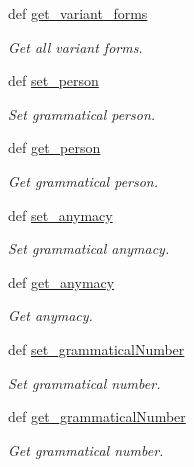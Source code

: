 \begin{DoxyCompactItemize}
def \hyperlink{classlmf_1_1src_1_1morphology_1_1word__form_1_1_word_form_a983151c5529388c7a3002b3239a98b98}{get\+\_\+variant\+\_\+forms}
\begin{DoxyCompactList}\small\item\em Get all variant forms. \end{DoxyCompactList}\item 
def \hyperlink{classlmf_1_1src_1_1morphology_1_1word__form_1_1_word_form_aae046a3403c0fe9ae8f35289878cba67}{set\+\_\+person}
\begin{DoxyCompactList}\small\item\em Set grammatical person. \end{DoxyCompactList}\item 
def \hyperlink{classlmf_1_1src_1_1morphology_1_1word__form_1_1_word_form_a480a6988b8ca2febc53b5d738ae12fac}{get\+\_\+person}
\begin{DoxyCompactList}\small\item\em Get grammatical person. \end{DoxyCompactList}\item 
def \hyperlink{classlmf_1_1src_1_1morphology_1_1word__form_1_1_word_form_a77770e33a70efbf55aa2279c2dbb1112}{set\+\_\+anymacy}
\begin{DoxyCompactList}\small\item\em Set grammatical anymacy. \end{DoxyCompactList}\item 
def \hyperlink{classlmf_1_1src_1_1morphology_1_1word__form_1_1_word_form_a15a5458e866a9bc063766393f1724618}{get\+\_\+anymacy}
\begin{DoxyCompactList}\small\item\em Get anymacy. \end{DoxyCompactList}\item 
def \hyperlink{classlmf_1_1src_1_1morphology_1_1word__form_1_1_word_form_afba8a8bff098989e06c9fce30e4c8163}{set\+\_\+grammatical\+Number}
\begin{DoxyCompactList}\small\item\em Set grammatical number. \end{DoxyCompactList}\item 
def \hyperlink{classlmf_1_1src_1_1morphology_1_1word__form_1_1_word_form_ae1d604cd7edc889a347d9ce41df150c6}{get\+\_\+grammatical\+Number}
\begin{DoxyCompactList}\small\item\em Get grammatical number. \end{DoxyCompactList}\item 

\end{DoxyCompactItemize}

